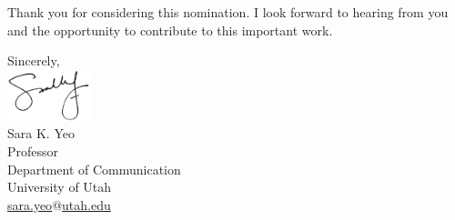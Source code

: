 \documentclass[12pt]{letter}
\begin{document}
Thank you for considering this nomination. I look forward to hearing from you and the opportunity to contribute to this important work.

\vspace{1em}

Sincerely,\\
\includegraphics[height=4em]{signature.png}\\
Sara K. Yeo\\
Professor\\
Department of Communication\\
University of Utah\\
\href{mailto:sara.yeo@utah.edu}{sara.yeo$@$utah.edu}

\newpage

\printbibliography
\end{document}
